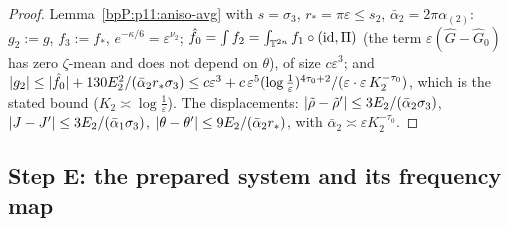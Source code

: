 \begin{proof}
\label{stepP:p11:as-concl} Lemma~\ref{bpP:p11:aniso-avg} with $s=\sigma_3$, $r_*=\pi\varepsilon\le s_2$, $\bar\alpha_2=2\pi\alpha_{(2)}$: $g_2:=g$, $f_3:=f_*$, $e^{-\kappa/6}=\varepsilon^{\nu_2}$; $\hat f_0=\int f_2=\int_{\mathbb{T}^{2n}}f_1\circ(\mathrm{id},\Pi)$ (the term $\varepsilon(\hat G-\hat G_0)$ has zero $\zeta$-mean and does not depend on $\theta$), of size $c\varepsilon^3$; and $\lvert g_2\rvert\le\lvert \hat f_0\rvert+130E_2^2/(\bar\alpha_2r_*\sigma_3)\le c\varepsilon^3+c\,\varepsilon^5(\log\frac1\varepsilon)^{4\tau_0+2}/(\varepsilon\cdot\varepsilon\,K_2^{-\tau_0})$, which is the stated bound ($K_2\asymp\log\frac1\varepsilon$). The displacements: $\lvert \tilde\rho-\tilde\rho'\rvert\le3E_2/(\bar\alpha_2\sigma_3)$, $\lvert J-J'\rvert\le3E_2/(\bar\alpha_1\sigma_3)$, $\lvert \theta-\theta'\rvert\le9E_2/(\bar\alpha_2r_*)$, with $\bar\alpha_2\asymp\varepsilon K_2^{-\tau_0}$.
\end{proof}

\subsection{Step E: the prepared system and its frequency map}\label{bpP:p11:sec-E}

